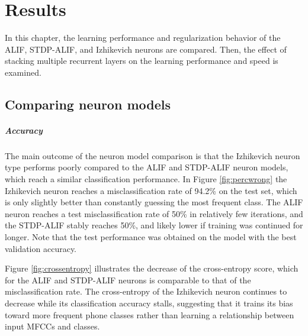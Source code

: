 \chapter{Results}\label{ch:results}
In this chapter, the learning performance and regularization behavior of the ALIF, STDP-ALIF, and Izhikevich neurons are compared.
Then, the effect of stacking multiple recurrent layers on the learning performance and speed is examined.

\section{Comparing neuron models}
	\paragraph{Accuracy}
		The main outcome of the neuron model comparison is that the Izhikevich neuron type performs poorly compared to the ALIF and STDP-ALIF neuron models, which reach a similar classification performance.
		In Figure \ref{fig:percwrong} the Izhikevich neuron reaches a misclassification rate of 94.2\% on the test set, which is only slightly better than constantly guessing the most frequent class.
		The ALIF neuron reaches a test misclassification rate of 50\% in relatively few iterations, and the STDP-ALIF stably reaches 50\%, and likely lower if training was continued for longer.
		Note that the test performance was obtained on the model with the best validation accuracy.

		Figure \ref{fig:crossentropy} illustrates the decrease of the cross-entropy score, which for the ALIF and STDP-ALIF neurons is comparable to that of the misclassification rate.
		The cross-entropy of the Izhikevich neuron continues to decrease while its classification accuracy stalls, suggesting that it trains its bias toward more frequent phone classes rather than learning a relationship between input MFCCs and classes.


